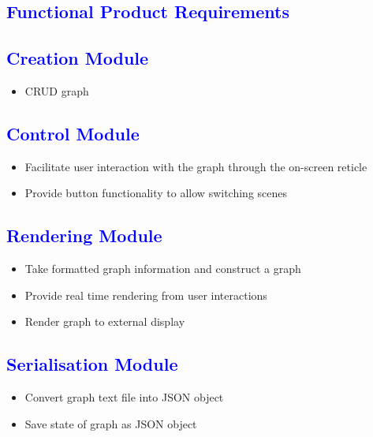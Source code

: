 \documentclass[12pt]{article}
\begin{document}
\textcolor{blue}{\section{Functional Product Requirements}}
\begin{flushleft}
  
  \textcolor{blue}{\subsection{Creation Module}}  
  \begin{flushleft}
  \begin{itemize}
  \item CRUD graph
  \end{itemize} 
  \end{flushleft}
  
  \textcolor{blue}{\subsection{Control Module}} 
  \begin{flushleft}
  \begin{itemize}
  \item Facilitate user interaction with the graph through the on-screen reticle
  \item Provide button functionality to allow switching scenes
  \end{itemize} 
  \end{flushleft}
  
  \textcolor{blue}{\subsection{Rendering Module}} 
  \begin{flushleft}
  \begin{itemize}
  \item Take formatted graph information and construct a graph
  \item Provide real time rendering from user interactions
  \item Render graph to external display
  \end{itemize} 
  \end{flushleft}
  
  \textcolor{blue}{\subsection{Serialisation Module}} 
  \begin{flushleft}
  \begin{itemize}
  \item Convert graph text file into JSON object
  \item Save state of graph as JSON object
  \end{itemize} 
  \end{flushleft}

\end{flushleft}
\end{document}
